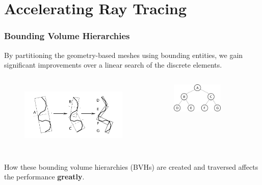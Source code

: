 \documentclass[12pt]{beamer}
\begin{document}
\section{Accelerating Ray Tracing} %


\begin{frame}
\frametitle{Bounding Volume Hierarchies}


By partitioning the geometry-based meshes using bounding entities, we gain significant improvements over a linear search of the discrete elements.
\begin{columns}
  \begin{figure}
    \centering
    \includegraphics[width=1.1\textwidth]{bvh_2d_ex_w_labels.png} 
    \cite{gottschalk1996obbtree}
  \end{figure}
  
  \begin{figure}
    \centering
    \includegraphics[width=0.7\textwidth]{binary_graph.png}
  \end{figure}
\end{columns}
\vfill
How these bounding volume hierarchies (BVHs) are created and traversed affects the performance \textbf{greatly}.


\end{frame}
\end{document}
